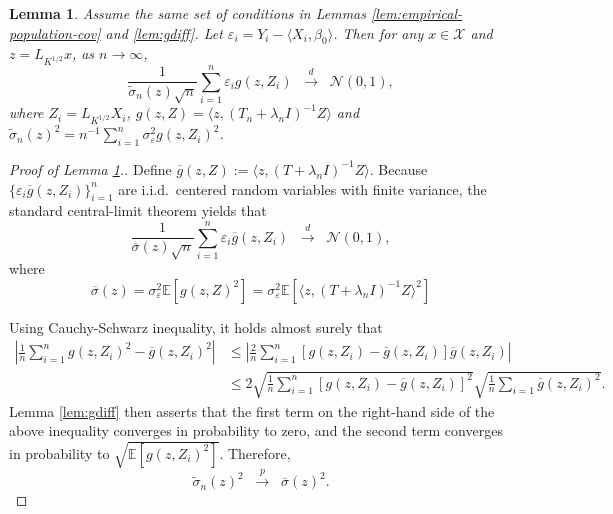 \documentclass[11pt,a4paper]{article}
\renewcommand{\tilde}{\widetilde}
\renewcommand{\bar}{\overline}
\theoremstyle{definition}
\theoremstyle{plain}
\newtheorem{lemma}{Lemma}[section]
\theoremstyle{remark}
\newcommand{\mX}{\mathcal X}
\begin{document}
\begin{lemma}
Assume the same set of conditions in Lemmas \ref{lem:empirical-population-cov} and \ref{lem:gdiff}. 
Let $\varepsilon_i = Y_i - \langle X_i,\beta_0\rangle$. 
Then for any $x\in\mX$ and $z=L_{K^{1/2}}x$, as $n\to\infty$, 
$$
\frac{1}{\tilde\sigma_n(z)\sqrt{n}}\sum_{i=1}^n \varepsilon_i g(z,Z_i)\;\;\overset{d}{\to}\;\; \mathcal N(0,1),
$$
where $Z_i=L_{K^{1/2}}X_i$, $g(z,Z)=\langle z,(T_n+\lambda_n I)^{-1}Z\rangle$ and $\tilde\sigma_n(z)^2 = n^{-1}\sum_{i=1}^n \sigma_\varepsilon^2g(z,Z_i)^2$.
\label{lem:isoclt}
\end{lemma}

\begin{proof}[Proof of Lemma \ref{lem:isoclt}.]
Define $\bar g(z,Z) := \langle z,(T+\lambda_n I)^{-1}Z\rangle$.
Because $\{\varepsilon_i\bar g(z,Z_i)\}_{i=1}^n$ are i.i.d.~centered random variables with finite variance, the standard central-limit theorem yields that
\begin{equation}
\frac{1}{\bar\sigma(z)\sqrt{n}}\sum_{i=1}^n \varepsilon_i\bar g(z,Z_i) \;\;\overset{d}{\to}\;\;\mathcal N(0,1),
\label{eq:proof-isoclt-1}
\end{equation}
where
$$
\bar\sigma(z) =\sigma_\varepsilon^2\mathbb E[g(z,Z)^2]= \sigma_\varepsilon^2\mathbb E[\langle z, (T+\lambda_n I)^{-1}Z\rangle^2]
$$

Using Cauchy-Schwarz inequality, it holds almost surely that
\begin{align*}
\left|\frac{1}{n}\sum_{i=1}^n g(z,Z_i)^2-\bar g(z,Z_i)^2\right| &\leq \left|\frac{2}{n}\sum_{i=1}^n [g(z,Z_i)-\bar g(z,Z_i)]\bar g(z,Z_i)\right|\\
&\leq 2\sqrt{\frac{1}{n}\sum_{i=1}^n[g(z,Z_i)-\bar g(z,Z_i)]^2}\sqrt{\frac{1}{n}\sum_{i=1}\bar g(z,Z_i)^2}.
\end{align*}
Lemma \ref{lem:gdiff} then asserts that the first term on the right-hand side of the above inequality converges in probability to zero, and the second term converges in probability to $\sqrt{\mathbb E[g(z,Z_i)^2]}$.
Therefore,
\begin{equation}
\tilde\sigma_n(z)^2 \;\;\overset{p}{\to}\;\; \bar\sigma(z)^2.
\label{eq:proof-isoclt-2}
\end{equation}


\end{proof}
\end{document}
